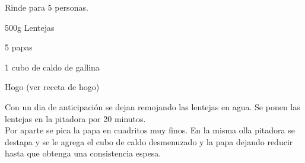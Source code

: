 
Rinde para 5 personas.

\begin{ingredientes}
\item 500g Lentejas
\item 5 papas
\item 1 cubo de caldo de gallina
\item Hogo (ver receta de hogo)
\end{ingredientes}
\preparacion
Con un dia de anticipación se dejan remojando las lentejas en agua. Se ponen las lentejas en la pitadora por 20 minutos.\\

Por aparte se pica la papa en cuadritos muy finos. En la misma olla pitadora se destapa y se le agrega el cubo de caldo desmenuzado y la papa dejando reducir hasta que obtenga una consistencia espesa.